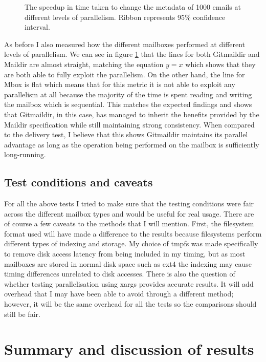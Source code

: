 \begin{figure}[h]
    \centering
    
    \caption{The speedup in time taken to change the metadata of 1000 emails at different levels of parallelism. Ribbon represents 95\% confidence interval.}
    \label{fig:tmpp_speedup_combined}
\end{figure}

As before I also measured how the different mailboxes performed at different levels of parallelism. We can see in figure \ref{fig:tmpp_speedup_combined} that the lines for both Gitmaildir and Maildir are almost straight, matching the equation $y=x$ which shows that they are both able to fully exploit the parallelism. On the other hand, the line for Mbox is flat which means that for this metric it is not able to exploit any parallelism at all because the majority of the time is spent reading and writing the mailbox which is sequential. This matches the expected findings and shows that Gitmaildir, in this case, has managed to inherit the benefits provided by the Maildir specification while still maintaining strong consistency. When compared to the delivery test, I believe that this shows Gitmaildir maintains its parallel advantage as long as the operation being performed on the mailbox is sufficiently long-running.

\subsection{Test conditions and caveats}

For all the above tests I tried to make sure that the testing conditions were fair across the different mailbox types and would be useful for real usage. There are of course a few caveats to the methods that I will mention. First, the filesystem format used will have made a difference to the results because filesystems perform different types of indexing and storage. My choice of tmpfs was made specifically to remove disk access latency from being included in my timing, but as most mailboxes are stored in normal disk space such as ext4 the indexing may cause timing differences unrelated to disk accesses. There is also the question of whether testing parallelisation using xargs provides accurate results. It will add overhead that I may have been able to avoid through a different method; however, it will be the same overhead for all the tests so the comparisons should still be fair.

\section{Summary and discussion of results}

